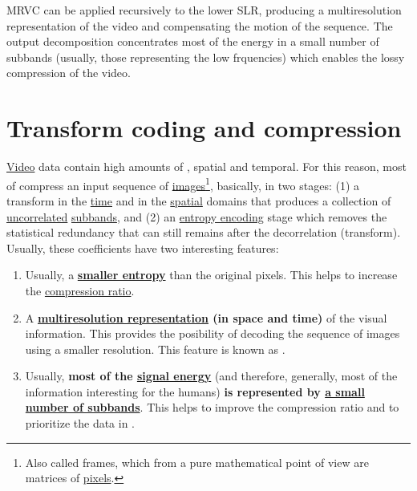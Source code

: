 MRVC can be applied recursively to the lower SLR, producing a
multiresolution representation of the video and compensating the
motion of the sequence. The output decomposition concentrates most of
the energy in a small number of subbands (usually, those representing
the low frquencies) which enables the lossy compression of the video.


\section{Transform coding and compression}

\href{https://en.wikipedia.org/wiki/Video}{Video} data contain high
amounts of , spatial and temporal. For
this reason, most of 
compress an input sequence of
\href{https://en.wikipedia.org/wiki/Digital_image}{images}\footnote{Also
  called frames, which from a pure mathematical point of view are
  matrices of \href{https://en.wikipedia.org/wiki/Pixel}{pixels}.},
basically, in two stages: (1) a transform in the
\href{https://en.wikipedia.org/wiki/Time_domain}{time} and in the
\href{https://www.quora.com/What-is-spatial-domain-in-image-processing}{spatial}
domains that produces a collection of
\href{https://en.wikipedia.org/wiki/Decorrelation}{uncorrelated}
\href{https://en.wikipedia.org/wiki/Discrete_wavelet_transform}{subbands},
and (2) an
\href{https://en.wikipedia.org/wiki/Entropy_encoding}{entropy
  encoding} stage which removes the statistical redundancy that can
still remains after the decorrelation (transform). Usually, these
coefficients have two interesting features:
\begin{enumerate}
\item Usually, a \textbf{
  \href{https://vicente-gonzalez-ruiz.github.io/symbol_compression/}{smaller
  entropy}} than the original pixels. This helps to increase
  the \href{https://en.wikipedia.org/wiki/Data_compression_ratio}{compression
    ratio}.
\item A
  \textbf{\href{https://en.wikipedia.org/wiki/Image_resolution}{multiresolution
      representation} (in space and time)} of the visual
  information. This provides the posibility of decoding the sequence
  of images using a smaller resolution. This feature is known as
  .
\item Usually, \textbf{most of the
  \href{https://en.wikipedia.org/wiki/Energy_(signal_processing)}{signal
    energy}} (and therefore, generally, most of the information
  interesting for the humans) \textbf{is represented by
    \href{https://vicente-gonzalez-ruiz.github.io/image_transformations_for_coding}{a
      small number of subbands}}. This helps to improve the
  compression ratio and to prioritize the data in
  .
\end{enumerate}

